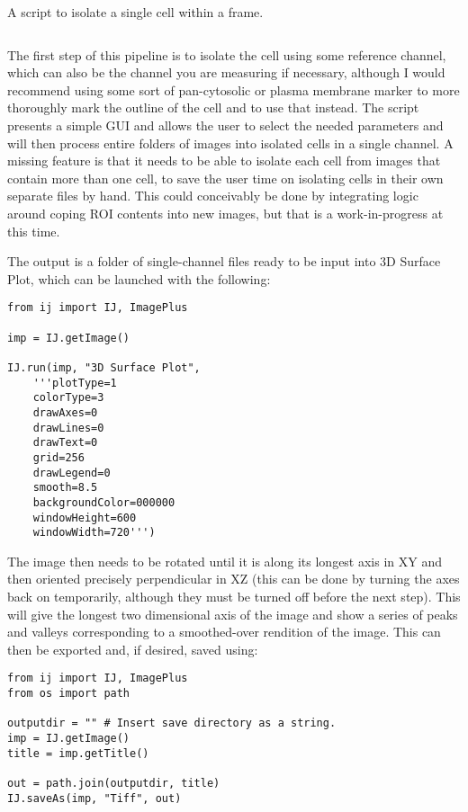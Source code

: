 \begin{code}
\caption{A script to isolate a single cell within a frame.}
\label{isolator}

\inputminted[breaklines,frame=single,fontsize=\small]{python}{source/autoIsolator.py}

\end{code}

The first step of this pipeline is to isolate the cell using some reference channel, which can also be the channel you are measuring if necessary, although I would recommend using some sort of pan-cytosolic or plasma membrane marker to more thoroughly mark the outline of the cell and to use that instead. The script presents a simple GUI and allows the user to select the needed parameters and will then process entire folders of images into isolated cells in a single channel. A missing feature is that it needs to be able to isolate each cell from images that contain more than one cell, to save the user time on isolating cells in their own separate files by hand. This could conceivably be done by integrating logic around coping ROI contents into new images, but that is a work-in-progress at this time.

The output is a folder of single-channel files ready to be input into 3D Surface Plot, which can be launched with the following:

\begin{code}
\begin{verbatim}
from ij import IJ, ImagePlus

imp = IJ.getImage()

IJ.run(imp, "3D Surface Plot", 
    '''plotType=1 
    colorType=3 
    drawAxes=0 
    drawLines=0 
    drawText=0 
    grid=256 
    drawLegend=0 
    smooth=8.5 
    backgroundColor=000000 
    windowHeight=600 
    windowWidth=720''')
\end{verbatim}
\end{code}

The image then needs to be rotated until it is along its longest axis in XY and then oriented precisely perpendicular in XZ (this can be done by turning the axes back on temporarily, although they must be turned off before the next step). This will give the longest two dimensional axis of the image and show a series of peaks and valleys corresponding to a smoothed-over rendition of the image. This can then be exported and, if desired, saved using:

\begin{code}
\begin{verbatim}
from ij import IJ, ImagePlus
from os import path

outputdir = "" # Insert save directory as a string.
imp = IJ.getImage()
title = imp.getTitle()

out = path.join(outputdir, title)
IJ.saveAs(imp, "Tiff", out)
\end{verbatim}
\end{code}

